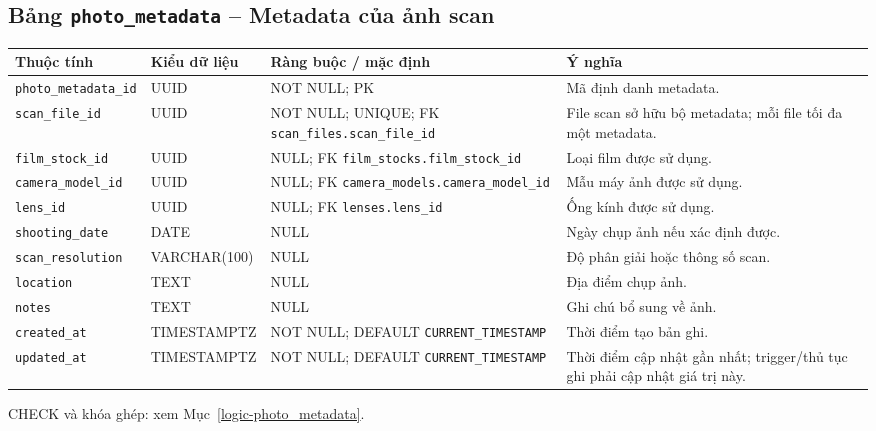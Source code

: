 \subsection{Bảng \texttt{photo\_\allowbreak{}metadata} -- Metadata của ảnh scan}
\label{dictionary-photo_metadata}
\begingroup
\footnotesize
\setlength{\tabcolsep}{3pt}
\begin{longtable}{>{\raggedright\arraybackslash}p{3.1cm}>{\raggedright\arraybackslash}p{2.5cm}>{\raggedright\arraybackslash}p{3.7cm}>{\raggedright\arraybackslash}p{4.3cm}}
\toprule
Thuộc tính & Kiểu dữ liệu & Ràng buộc / mặc định & Ý nghĩa \\
\midrule
\endhead
\texttt{photo\_\allowbreak{}metadata\_\allowbreak{}id} & UUID & NOT NULL; PK & Mã định danh metadata. \\
\texttt{scan\_\allowbreak{}file\_\allowbreak{}id} & UUID & NOT NULL; UNIQUE; FK \texttt{scan\_\allowbreak{}files.scan\_\allowbreak{}file\_\allowbreak{}id} & File scan sở hữu bộ metadata; mỗi file tối đa một metadata. \\
\texttt{film\_\allowbreak{}stock\_\allowbreak{}id} & UUID & NULL; FK \texttt{film\_\allowbreak{}stocks.film\_\allowbreak{}stock\_\allowbreak{}id} & Loại film được sử dụng. \\
\texttt{camera\_\allowbreak{}model\_\allowbreak{}id} & UUID & NULL; FK \texttt{camera\_\allowbreak{}models.camera\_\allowbreak{}model\_\allowbreak{}id} & Mẫu máy ảnh được sử dụng. \\
\texttt{lens\_\allowbreak{}id} & UUID & NULL; FK \texttt{lenses.lens\_\allowbreak{}id} & Ống kính được sử dụng. \\
\texttt{shooting\_\allowbreak{}date} & DATE & NULL & Ngày chụp ảnh nếu xác định được. \\
\texttt{scan\_\allowbreak{}resolution} & VARCHAR(100) & NULL & Độ phân giải hoặc thông số scan. \\
\texttt{location} & TEXT & NULL & Địa điểm chụp ảnh. \\
\texttt{notes} & TEXT & NULL & Ghi chú bổ sung về ảnh. \\
\texttt{created\_\allowbreak{}at} & TIMESTAMPTZ & NOT NULL; DEFAULT \texttt{CURRENT\_\allowbreak{}TIMESTAMP} & Thời điểm tạo bản ghi. \\
\texttt{updated\_\allowbreak{}at} & TIMESTAMPTZ & NOT NULL; DEFAULT \texttt{CURRENT\_\allowbreak{}TIMESTAMP} & Thời điểm cập nhật gần nhất; trigger/thủ tục ghi phải cập nhật giá trị này. \\
\bottomrule
\end{longtable}
\endgroup
CHECK và khóa ghép: xem Mục~\ref{logic-photo_metadata}.
